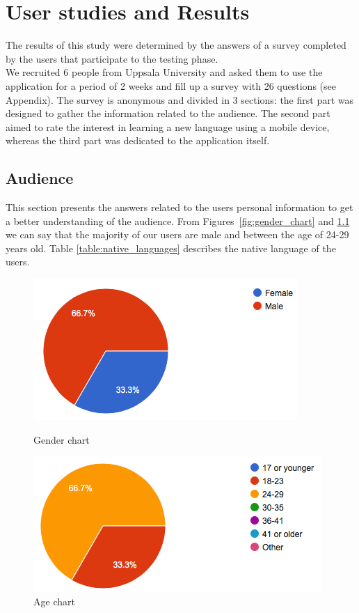 \chapter{User studies and Results}
\label{chap:results}

The results of this study were determined by the answers of a survey completed by the users that participate to the testing phase. \\
\noindent We recruited 6 people from Uppsala University and asked them to use the application for a period of 2 weeks and fill up a survey with 26 questions (see Appendix). The survey is anonymous and divided in 3 sections: the first part was designed to gather the information related to the audience. The second part aimed to rate the interest in learning a new language using a mobile device, whereas the third part was dedicated to the application itself. \\

\section{Audience}
\label{sub:Audience}

This section presents the answers related to the users personal information to get a better understanding of the audience. From Figures~\ref{fig:gender_chart} and \ref{fig:age_chart} we can say that the majority of our users are male and between the age of 24-29 years old.  Table \ref{table:native_languages} describes the native language of the users.

\begin{figure}[!ht]
	\centering
	\begin{minipage}{.5\textwidth}
		\centering
		\includegraphics[scale=0.5]{Figures/responses/audience_gender.png}
		\caption{Gender chart}
		\label{fig:gender_chart}
	\end{minipage}%
	\begin{minipage}{.5\textwidth}
		\centering
		\includegraphics[scale=0.5]{Figures/responses/audience_age.png}
		\caption{Age chart}
		\label{fig:age_chart}
	\end{minipage}
\end{figure}

